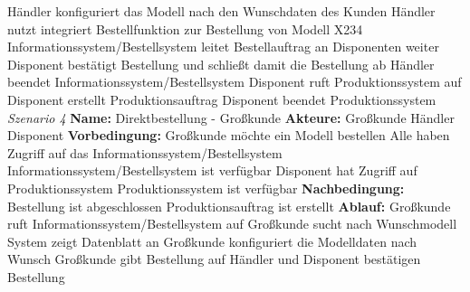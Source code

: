 \documentclass{swp1}
\begin{document}
Händler konfiguriert das Modell nach den Wunschdaten des Kunden\newline
Händler nutzt integriert Bestellfunktion zur Bestellung von Modell X234\newline
Informationssystem/Bestellsystem leitet Bestellauftrag an Disponenten weiter\newline
Disponent bestätigt Bestellung und schließt damit die Bestellung ab\newline
Händler beendet Informationssystem/Bestellsystem\newline
Disponent ruft Produktionssystem auf\newline
Disponent erstellt Produktionsauftrag\newline
Disponent beendet Produktionssystem\newline
\newline
\emph{Szenario 4}\newline
\textbf{Name:}\newline
Direktbestellung - Großkunde\newline
\textbf{Akteure:}\newline
Großkunde\newline
Händler\newline
Disponent\newline
\textbf{Vorbedingung:}\newline
Großkunde möchte ein Modell bestellen\newline
Alle haben Zugriff auf das Informationssystem/Bestellsystem\newline
Informationssystem/Bestellsystem ist verfügbar\newline
Disponent hat Zugriff auf Produktionssystem\newline
Produktionssystem ist verfügbar\newline
\textbf{Nachbedingung:}\newline
Bestellung ist abgeschlossen\newline
Produktionsauftrag ist erstellt\newline
\textbf{Ablauf:}\newline
Großkunde ruft Informationssystem/Bestellsystem auf\newline
Großkunde sucht nach Wunschmodell\newline
System zeigt Datenblatt an\newline
Großkunde konfiguriert die Modelldaten nach Wunsch\newline
Großkunde gibt Bestellung auf\newline
Händler und Disponent bestätigen Bestellung\newline
\end{document}
